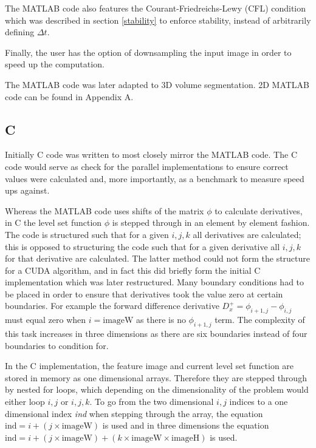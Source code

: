 The MATLAB code also features the Courant-Friedreichs-Lewy (CFL) condition which was described in section \ref{stability} to enforce stability, instead of arbitrarily defining $\Delta t$.

Finally, the user has the option of downsampling the input image in order to speed up the computation.

The MATLAB code was later adapted to 3D volume segmentation. 2D MATLAB code can be found in Appendix A.

	\subsection{C}
Initially C code was written to most closely mirror the MATLAB code. The C code would serve as check for the parallel implementations to ensure correct values were calculated and, more importantly, as a benchmark to measure speed ups against. 

Whereas the MATLAB code uses shifts of the matrix $\phi$ to calculate derivatives, in C the level set function $\phi$ is stepped through in an element by element fashion. The code is structured such that for a given $i,j,k$ all derivatives are calculated; this is opposed to structuring the code such that for a given derivative all $i,j,k$ for that derivative are calculated. The latter method could not form the structure for a CUDA algorithm, and in fact this did briefly form the initial C implementation which was later restructured. Many boundary conditions had to be placed in order to ensure that derivatives took the value zero at certain boundaries. For example the forward difference derivative $D_x^+ =\phi_{i+1,j}-\phi_{i,j}$ must equal zero when $i=\textrm{imageW}$ as there is no $\phi_{i+1,j}$ term. The complexity of this task increases in three dimensions as there are six boundaries instead of four boundaries to condition for.

In the C implementation, the feature image and current level set function are stored in memory as one dimensional arrays. Therefore they are stepped through by nested for loops, which depending on the dimensionality of the problem would either loop $i,j$ or $i,j,k$. To go from the two dimensional $i,j$ indices to a one dimensional index \textit{ind} when stepping through the array, the equation $\textrm{ind} = i + (j \times \textrm{imageW})$ is used and in three dimensions the equation $\textrm{ind} = i + (j \times \textrm{imageW}) + (k \times \textrm{imageW} \times \textrm{imageH})$ is used. 

